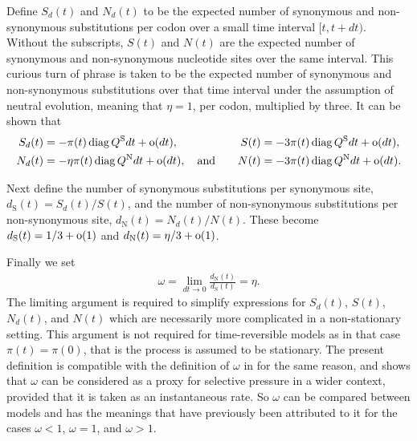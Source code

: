 \documentclass[a4paper,oneside,12pt]{article}
\begin{document}
Define $S_d(t)$ and $N_d(t)$ to be the expected number of synonymous and non-synonymous substitutions per codon over a small time interval $[t,t+dt)$. Without the subscripts, $S(t)$ and $N(t)$ are the expected number of synonymous and non-synonymous nucleotide sites over the same interval. This curious turn of phrase is taken to be the expected number of synonymous and non-synonymous substitutions over that time interval under the assumption of neutral evolution, meaning that $\eta=1$, per codon, multiplied by three. It can be shown that 
\begin{align*}
S_d(t) &= -\pi(t)\operatorname{diag} Q^\text{S}dt + \operatorname{o}(dt),&S(t) &= -3\pi(t)\operatorname{diag} Q^\text{S}dt + \operatorname{o}(dt),\\
N_d(t) &= -\eta\pi(t)\operatorname{diag} Q^\text{N}dt + \operatorname{o}(dt),\quad\text{and}\quad &N(t) &= -3\pi(t)\operatorname{diag} Q^\text{N}dt + \operatorname{o}(dt).
\end{align*}

Next define the number of synonymous substitutions per synonymous site, $d_\text{S}(t)=S_d(t)/S(t)$, and the number of non-synonymous substitutions per non-synonymous site, $d_\text{N}(t)=N_d(t)/N(t)$. These become $d_\text{S}(t)=1/3+\operatorname{o}(1)$ and $d_\text{N}(t)=\eta/3+\operatorname{o}(1)$.

Finally we set
\begin{align*}
\omega = \lim_{dt\rightarrow0}\frac{d_\text{N}(t)}{d_\text{S}(t)} = \eta.
\end{align*}
The limiting argument is required to simplify expressions for $S_d(t)$, $S(t)$, $N_d(t)$, and $N(t)$ which are necessarily more complicated in a non-stationary setting. This argument is not required for time-reversible models as in that case $\pi(t)=\pi(0)$, that is the process is assumed to be stationary. The present definition is compatible with the definition of $\omega$ in \citet{yang2006computational} for the same reason, and shows that $\omega$ can be considered as a proxy for selective pressure in a wider context, provided that it is taken as an instantaneous rate. So $\omega$ can be compared between models and has the meanings that have previously been attributed to it for the cases $\omega<1$, $\omega=1$, and $\omega>1$.



\end{document}
